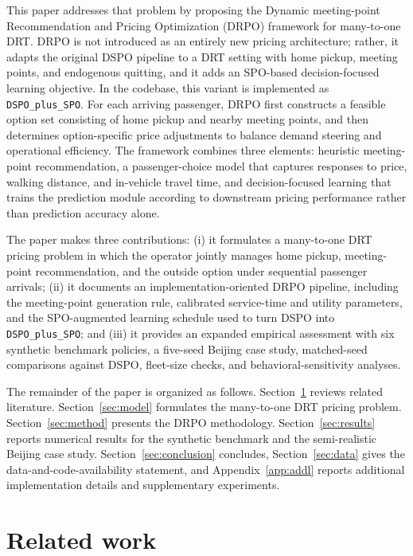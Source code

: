 \documentclass[preprint,12pt,authoryear]{elsarticle}
\begin{document}
This paper addresses that problem by proposing the Dynamic meeting-point Recommendation and Pricing Optimization (DRPO) framework for many-to-one DRT. DRPO is not introduced as an entirely new pricing architecture; rather, it adapts the original DSPO pipeline to a DRT setting with home pickup, meeting points, and endogenous quitting, and it adds an SPO-based decision-focused learning objective. In the codebase, this variant is implemented as \texttt{DSPO\_plus\_SPO}. For each arriving passenger, DRPO first constructs a feasible option set consisting of home pickup and nearby meeting points, and then determines option-specific price adjustments to balance demand steering and operational efficiency. The framework combines three elements: heuristic meeting-point recommendation, a passenger-choice model that captures responses to price, walking distance, and in-vehicle travel time, and decision-focused learning that trains the prediction module according to downstream pricing performance rather than prediction accuracy alone.

The paper makes three contributions: (i) it formulates a many-to-one DRT pricing problem in which the operator jointly manages home pickup, meeting-point recommendation, and the outside option under sequential passenger arrivals; (ii) it documents an implementation-oriented DRPO pipeline, including the meeting-point generation rule, calibrated service-time and utility parameters, and the SPO-augmented learning schedule used to turn DSPO into \texttt{DSPO\_plus\_SPO}; and (iii) it provides an expanded empirical assessment with six synthetic benchmark policies, a five-seed Beijing case study, matched-seed comparisons against DSPO, fleet-size checks, and behavioral-sensitivity analyses.

The remainder of the paper is organized as follows. Section~\ref{sec:related} reviews related literature. Section~\ref{sec:model} formulates the many-to-one DRT pricing problem. Section~\ref{sec:method} presents the DRPO methodology. Section~\ref{sec:results} reports numerical results for the synthetic benchmark and the semi-realistic Beijing case study. Section~\ref{sec:conclusion} concludes, Section~\ref{sec:data} gives the data-and-code-availability statement, and Appendix~\ref{app:addl} reports additional implementation details and supplementary experiments.

\section{Related work}
\label{sec:related}
\end{document}
